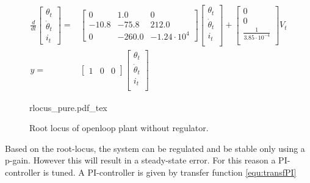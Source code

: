\documentclass[../../../Main]{subfiles}
\begin{document}
\begin{equation}
      \begin{split}
      \label{eq:zero_linearized}
      \frac{d}{dt}
    \begin{bmatrix}
        \theta_t \\
        \dot \theta_t \\
        i_t
    \end{bmatrix}
    =&
    \begin{bmatrix}0 & 1.0 & 0\\ -10.8 & -75.8 & 212.0\\ 0 & -260.0 & -1.24\cdot10^{4}\end{bmatrix}
    \begin{bmatrix}
        \theta_t \\
        \dot \theta_t \\
        i_t \\
    \end{bmatrix}
    +
    \begin{bmatrix}
        0 \\
        0 \\
	\frac{1}{3.85\cdot10^{-4}}\\
    \end{bmatrix}
    V_t
\\
      y =&
    \begin{bmatrix}
        1 & 0 & 0
    \end{bmatrix}
    \begin{bmatrix}
        \theta_t \\
        \dot \theta_t\\
        i_t\\
    \end{bmatrix}
    \end{split}
\end{equation}

\begin{figure}[H]
\centering
\def\svgwidth{\textwidth}
{rlocus_pure.pdf_tex}
\caption{Root locus of openloop plant without regulator.}
\label{fig:rlocus_pure}
\end{figure}

Based on the root-locus, the system can be regulated and be stable only using a p-gain.
However this will result in a steady-state error. For this reason a PI-controller is tuned.
A PI-controller is given by transfer function \eqref{equ:transfPI}
\end{document}
